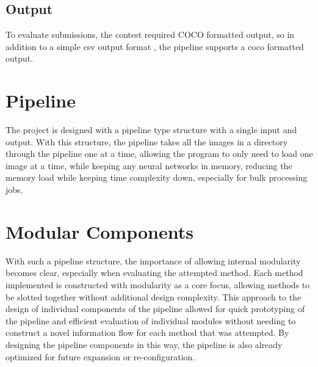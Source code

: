 \subsection{Output}

To evaluate submissions, the contest required COCO formatted output, so in addition to a simple csv output format , the pipeline supports a coco formatted output.

\section{Pipeline}

The project is designed with a pipeline type structure with a single input and output. With this structure, the pipeline takes all the images in a directory through the pipeline one at a time, allowing the program to only need to load one image at a time, while keeping any neural networks in memory, reducing the memory load while keeping time complexity down, especially for bulk processing jobs.

\section{Modular Components}

With such a pipeline structure, the importance of allowing internal modularity becomes clear, especially when evaluating the attempted method. Each method implemented is constructed with modularity as a core focus, allowing methods to be slotted together without additional design complexity. This approach to the design of individual components of the pipeline allowed for quick prototyping of the pipeline and efficient evaluation of individual modules without needing to construct a novel information flow for each method that was attempted. By designing the pipeline components in this way, the pipeline is also already optimized for future expansion or re-configuration.
